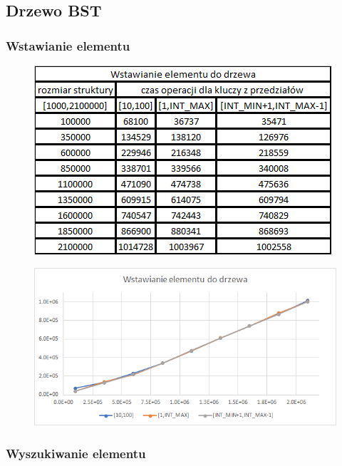 \documentclass{article}
\begin{document}
\newpage

\subsection{Drzewo BST}

\subsubsection*{Wstawianie elementu}

\begin{figure}[h!]

\includegraphics{images/drzewo_wstawianie.png}

\end{figure}

\begin{figure}[h!]
\includegraphics[width=11.3cm]{images/wstawianie_drzewo_w.png}
\end{figure}

\newpage

\subsubsection*{Wyszukiwanie elementu}
\end{document}
